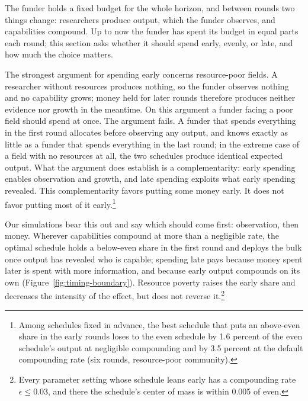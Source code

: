 \documentclass[article, 11pt, reqno]{amsart}
\theoremstyle{named}
\begin{document}
The funder holds a fixed budget for the whole horizon, and between rounds two things change: researchers produce output, which the funder observes, and capabilities compound. Up to now the funder has spent its budget in equal parts each round; this section asks whether it should spend early, evenly, or late, and how much the choice matters.

The strongest argument for spending early concerns resource-poor fields. A researcher without resources produces nothing, so the funder observes nothing and no capability grows; money held for later rounds therefore produces neither evidence nor growth in the meantime. On this argument a funder facing a poor field should spend at once. The argument fails. A funder that spends everything in the first round allocates before observing any output, and knows exactly as little as a funder that spends everything in the last round; in the extreme case of a field with no resources at all, the two schedules produce identical expected output. What the argument does establish is a complementarity: early spending enables observation and growth, and late spending exploits what early spending revealed. This complementarity favors putting some money early. It does not favor putting most of it early.\footnote{Among schedules fixed in advance, the best schedule that puts an above-even share in the early rounds loses to the even schedule by 1.6 percent of the even schedule's output at negligible compounding and by 3.5 percent at the default compounding rate (six rounds, resource-poor community).}

Our simulations bear this out and say which should come first: observation, then money. Wherever capabilities compound at more than a negligible rate, the optimal schedule holds a below-even share in the first round and deploys the bulk once output has revealed who is capable; spending late pays because money spent later is spent with more information, and because early output compounds on its own (Figure~\ref{fig:timing-boundary}). Resource poverty raises the early share and decreases the intensity of the effect, but does not reverse it.\footnote{Every parameter setting whose schedule leans early has a compounding rate $\epsilon \leq 0.03$, and there the schedule's center of mass is within 0.005 of even.}


\end{document}
